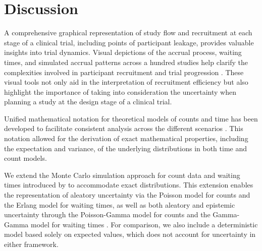 

\chapter{Discussion}

A comprehensive graphical representation of study flow and recruitment at each stage of a clinical trial, including points of participant leakage, provides valuable insights into trial dynamics. Visual depictions of the accrual process, waiting times, and simulated accrual patterns across a hundred studies help clarify the complexities involved in participant recruitment and trial progression \citep{spiegelhalter2011visualizing}. These visual tools not only aid in the interpretation of recruitment efficiency but also highlight the importance of taking into consideration the uncertainty when planning a study at the design stage of a clinical trial.

Unified mathematical notation for theoretical models of counts and time has been developed to facilitate consistent analysis across the different scenarios \citep{anisimov2007modelling}. This notation allowed for the derivation of exact mathematical properties, including the expectation and variance, of the underlying distributions in both time and count models.

We extend the Monte Carlo simulation approach for count data and waiting times introduced by \cite{carter2004application} to accommodate exact distributions. This extension enables the representation of aleatory uncertainty via the Poisson model for counts and the Erlang model for waiting times, as well as both aleatory and epistemic uncertainty through the Poisson-Gamma model for counts and the Gamma-Gamma model for waiting times \citep{ohagan2006, anisimov2007modelling}. For comparison, we also include a deterministic model based solely on expected values, which does not account for uncertainty in either framework.

% 
% 


